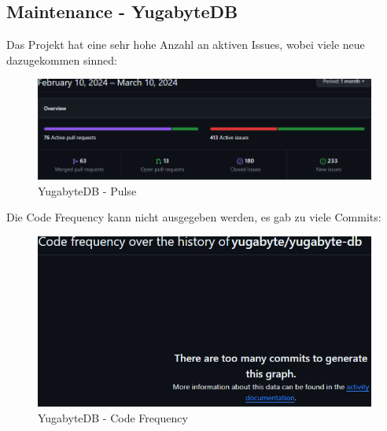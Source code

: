 
\begin{flushleft}
    \subsection{Maintenance - YugabyteDB}
    \label{subsec:maintenance_yugabytedb}
    Das Projekt hat eine sehr hohe Anzahl an aktiven Issues, wobei viele neue dazugekommen sinned:
    \begin{figure}[H]
        \centering
        \includegraphics[width=0.75\linewidth]{source/implementation/evaluation/postgresql_ha_solutions/insights/yugabytedb/pulse_yugabyte_yugabyte-db}
        \caption{YugabyteDB - Pulse}
        \label{fig:pulse_yugabyte_yugabyte-db}
    \end{figure}

    Die Code Frequency kann nicht ausgegeben werden, es gab zu viele Commits:
    \begin{figure}[H]
        \centering
        \includegraphics[width=0.75\linewidth]{source/implementation/evaluation/postgresql_ha_solutions/insights/yugabytedb/code_frequency_yugabyte_yugabyte-db}
        \caption{YugabyteDB - Code Frequency}
        \label{fig:code_frequency_yugabyte_yugabyte-db}
    \end{figure}


\end{flushleft}
